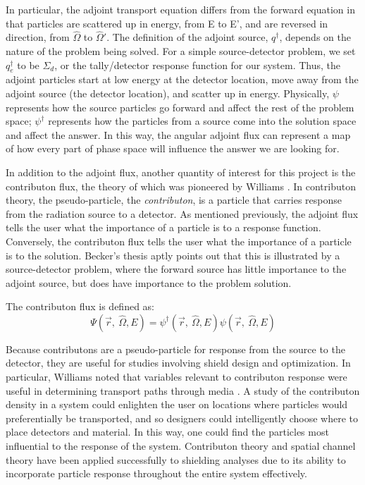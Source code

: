 \documentclass[12pt]{article}
\newcommand{\vOmega}{\ensuremath{\hat{\Omega}}}
\begin{document}
In particular, the adjoint transport equation differs from the forward equation in that particles are scattered up in energy, from E to E', and are reversed in direction, from $\vOmega$ to $\vOmega'$. The definition of the adjoint source, $q^{\dagger}$, depends on the nature of the problem being solved. For a simple source-detector problem, we set $q_{e}^\dagger$ to be $\Sigma _{ d }$, or the tally/detector response function for our system. Thus, the adjoint particles start at low energy at the detector location, move away from the adjoint source (the detector location), and scatter up in energy. Physically, $\psi$ represents how the source particles go forward and affect the rest of the problem space; $\psi^{\dagger}$ represents how the particles from a source come into the solution space and affect the answer. In this way, the angular adjoint flux can represent a map of how every part of phase space will influence the answer we are looking for.

In addition to the adjoint flux, another quantity of interest for this project is the contributon flux, the theory of which was pioneered by Williams \cite{williams_generalized_1991,williams_contributorn_1992,williams_contributon_study}. In contributon theory, the pseudo-particle, the \textit{contributon}, is a particle that carries response from the radiation source to a detector. As mentioned previously, the adjoint flux tells the user what the importance of a particle is to a response function. Conversely, the contributon flux tells the user what the importance of a particle is to the solution. Becker's thesis \cite{becker_hybrid_2009} aptly points out that this is illustrated by a source-detector problem, where the forward source has little importance to the adjoint source, but does have importance to the problem solution.

The contributon flux is defined as:
\begin{equation}
\Psi (\vec {r},\:\hat\Omega ,E) = \psi^{\dagger} (\vec {r},\:\hat\Omega ,E) \psi(\vec {r} ,\:\hat\Omega,E)
\end{equation}
\label{eq.Cont-Flux} 

Because contributons are a pseudo-particle for response from the source to the detector, they are useful for studies involving shield design and optimization. In particular, Williams noted that variables relevant to contributon response were useful in determining transport paths through media \cite{williams_contributon_study, williams_SCC_shielding}. A study of the contributon density in a system could enlighten the user on locations where particles would preferentially be transported, and so designers could intelligently choose where to place detectors and material. In this way, one could find the particles most influential to the response of the system. Contributon theory and spatial channel theory have been applied successfully to shielding analyses \cite{seydaliev_contributon_2008, williams_SCC_shielding} due to its ability to incorporate particle response throughout the entire system effectively. 
\end{document}
